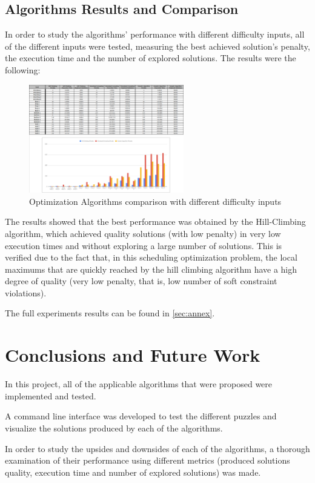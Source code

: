 \documentclass[conference]{IEEEtran}
\begin{document}
\subsection{Algorithms Results and Comparison}

In order to study the algorithms' performance with different difficulty inputs, all of the different inputs were tested, measuring the best achieved solution's penalty, the execution time and the number of explored solutions. The results were the following:

\begin{figure}[H]
    \centerline{\includegraphics[width=255px]{comparison.png}}
    \caption{Optimization Algorithms comparison with different difficulty inputs}
\end{figure}

The results showed that the best performance was obtained by the Hill-Climbing algorithm, which achieved quality solutions (with low penalty) in very low execution times and without exploring a large number of solutions. This is verified due to the fact that, in this scheduling optimization problem, the local maximums that are quickly reached by the hill climbing algorithm have a high degree of quality (very low penalty, that is, low number of soft constraint violations). 

The full experiments results can be found in \autoref{sec:annex}.

\section{Conclusions and Future Work}

In this project, all of the applicable algorithms that were proposed were implemented and tested.

A command line interface was developed to test the different puzzles and visualize the solutions produced by each of the algorithms.

In order to study the upsides and downsides of each of the algorithms, a thorough examination of their performance using different metrics (produced solutions quality, execution time and number of explored solutions) was made. 
\end{document}
